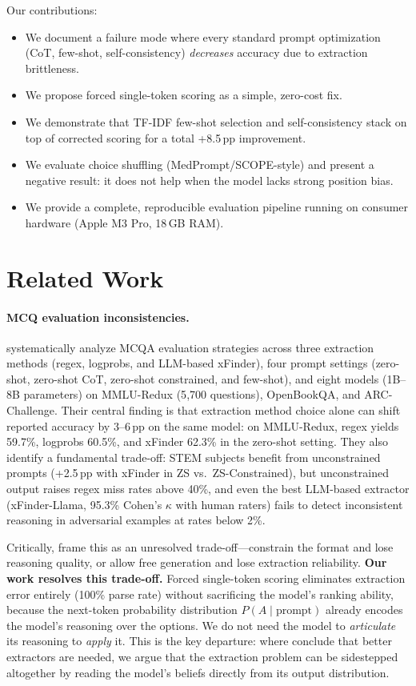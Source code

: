\documentclass[11pt]{article}
\begin{document}
Our contributions:
\begin{itemize}
    \item We document a failure mode where every standard prompt optimization (CoT, few-shot, self-consistency) \emph{decreases} accuracy due to extraction brittleness.
    \item We propose forced single-token scoring as a simple, zero-cost fix.
    \item We demonstrate that TF-IDF few-shot selection and self-consistency stack on top of corrected scoring for a total +8.5\,pp improvement.
    \item We evaluate choice shuffling (MedPrompt/SCOPE-style) and present a negative result: it does not help when the model lacks strong position bias.
    \item We provide a complete, reproducible evaluation pipeline running on consumer hardware (Apple M3 Pro, 18\,GB RAM).
\end{itemize}

\section{Related Work}

\paragraph{MCQ evaluation inconsistencies.}
\citet{molfese2025} systematically analyze MCQA evaluation strategies across three extraction methods (regex, logprobs, and LLM-based xFinder), four prompt settings (zero-shot, zero-shot CoT, zero-shot constrained, and few-shot), and eight models (1B--8B parameters) on MMLU-Redux (5{,}700 questions), OpenBookQA, and ARC-Challenge. Their central finding is that extraction method choice alone can shift reported accuracy by 3--6\,pp on the same model: on MMLU-Redux, regex yields 59.7\%, logprobs 60.5\%, and xFinder 62.3\% in the zero-shot setting. They also identify a fundamental trade-off: STEM subjects benefit from unconstrained prompts (+2.5\,pp with xFinder in ZS vs.\ ZS-Constrained), but unconstrained output raises regex miss rates above 40\%, and even the best LLM-based extractor (xFinder-Llama, 95.3\% Cohen's $\kappa$ with human raters) fails to detect inconsistent reasoning in adversarial examples at rates below 2\%.

Critically, \citeauthor{molfese2025} frame this as an unresolved trade-off---constrain the format and lose reasoning quality, or allow free generation and lose extraction reliability. \textbf{Our work resolves this trade-off.} Forced single-token scoring eliminates extraction error entirely (100\% parse rate) without sacrificing the model's ranking ability, because the next-token probability distribution $P(A \mid \text{prompt})$ already encodes the model's reasoning over the options. We do not need the model to \emph{articulate} its reasoning to \emph{apply} it. This is the key departure: where \citeauthor{molfese2025} conclude that better extractors are needed, we argue that the extraction problem can be sidestepped altogether by reading the model's beliefs directly from its output distribution.
\end{document}
